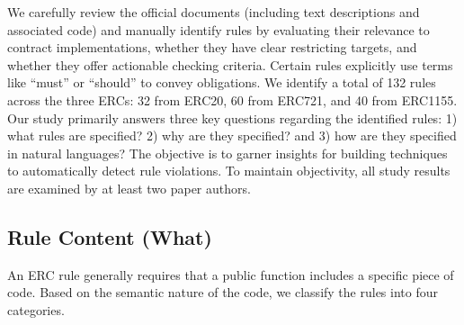 We carefully review the official documents (including text descriptions and associated code)
and manually identify rules by evaluating their relevance to contract implementations, 
whether they have clear restricting targets, and whether they offer actionable checking criteria. 
Certain rules explicitly use terms like ``must'' or ``should'' to convey obligations.
%
We identify a total of 132 rules across the three ERCs: 32 
from ERC20, 60 from ERC721, and 40 from ERC1155. %
Our study primarily answers three key questions regarding the identified rules: 
1) what rules are specified? 2) why are they specified? and 
3) how are they specified in natural languages? 
The objective is to garner insights 
for building techniques to automatically detect rule violations. 
To maintain objectivity, all study results are examined by at 
least two paper authors.




\subsection{Rule Content (What)}
\label{sec:what}
An ERC rule generally requires that a public function includes a specific piece of code. 
Based on the semantic nature of the code, we classify the rules into four categories.


